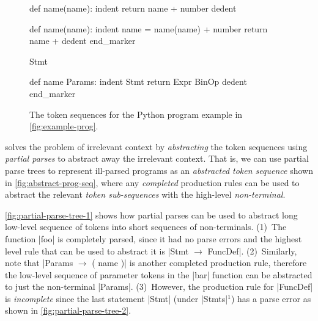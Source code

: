 \begin{figure}[t]
\centering
\begin{minipage}[t]{0.56\linewidth}
\centering
\begin{ecode}
def name(name): \n
indent return name + number \n
dedent \n

def name(name): \n
indent name = name(name) + number \n
return name + \n
dedent end_marker
\end{ecode}
\label{fig:prog-seq}
\end{minipage}%
\hspace{0.02\linewidth}%
\begin{minipage}[t]{0.42\linewidth}
\centering
\begin{ecode}
Stmt \n

def name Params: \n
indent Stmt \n
return Expr BinOp \n
dedent end_marker
\end{ecode}
\label{fig:abstract-prog-seq}
\end{minipage}
\caption{The token sequences for the Python program example in \autoref{fig:example-prog}.}
\end{figure}

%
\toolname solves the problem of irrelevant context by \emph{abstracting} the
token sequences using \emph{partial parses} to abstract away the irrelevant
context.
%
That is, we can use partial parse trees to represent ill-parsed programs as an
\emph{abstracted token sequence} shown in \autoref{fig:abstract-prog-seq}, where
any \emph{completed} production rules can be used to abstract the relevant
\emph{token sub-sequences} with the high-level \emph{non-terminal}.

\autoref{fig:partial-parse-tree-1} shows how partial parses can be used to
abstract long low-level sequence of tokens into short sequences of
non-terminals.
%
(1)~The function |foo| is completely parsed,
since it had no parse errors and the highest
level rule that can be used to abstract it is
%
|Stmt $\rightarrow$ FuncDef|.
%
(2)~Similarly, note that |Params $\rightarrow$ ( name )|
is another completed production rule, therefore the
low-level sequence of  parameter tokens in the |bar|
function can be abstracted to just the non-terminal |Params|.
%
(3)~However, the production rule for |FuncDef| is \emph{incomplete} since the
last statement |Stmt| (under |Stmts|$^1$) has a parse error as shown in
\autoref{fig:partial-parse-tree-2}.

